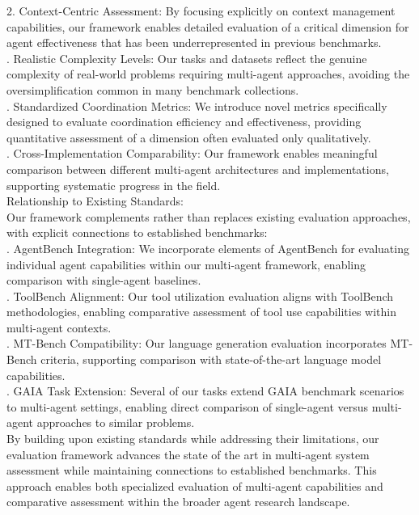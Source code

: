 2. Context-Centric Assessment: By focusing explicitly on context management capabilities, our framework enables detailed evaluation of a critical dimension for agent effectiveness that has been underrepresented in previous benchmarks.\\ . Realistic Complexity Levels: Our tasks and datasets reflect the genuine complexity of real-world problems requiring multi-agent approaches, avoiding the oversimplification common in many benchmark collections.\\ . Standardized Coordination Metrics: We introduce novel metrics specifically designed to evaluate coordination efficiency and effectiveness, providing quantitative assessment of a dimension often evaluated only qualitatively.\\ . Cross-Implementation Comparability: Our framework enables meaningful comparison between different multi-agent architectures and implementations, supporting systematic progress in the field.\\ \newline
Relationship to Existing Standards:\\ \newline
Our framework complements rather than replaces existing evaluation approaches, with explicit connections to established benchmarks:\\ . AgentBench Integration: We incorporate elements of AgentBench for evaluating individual agent capabilities within our multi-agent framework, enabling comparison with single-agent baselines.\\ . ToolBench Alignment: Our tool utilization evaluation aligns with ToolBench methodologies, enabling comparative assessment of tool use capabilities within multi-agent contexts.\\ . MT-Bench Compatibility: Our language generation evaluation incorporates MT-Bench criteria, supporting comparison with state-of-the-art language model capabilities.\\ . GAIA Task Extension: Several of our tasks extend GAIA benchmark scenarios to multi-agent settings, enabling direct comparison of single-agent versus multi-agent approaches to similar problems.\\ \newline
By building upon existing standards while addressing their limitations, our evaluation framework advances the state of the art in multi-agent system assessment while maintaining connections to established benchmarks. This approach enables both specialized evaluation of multi-agent capabilities and comparative assessment within the broader agent research landscape.\\

